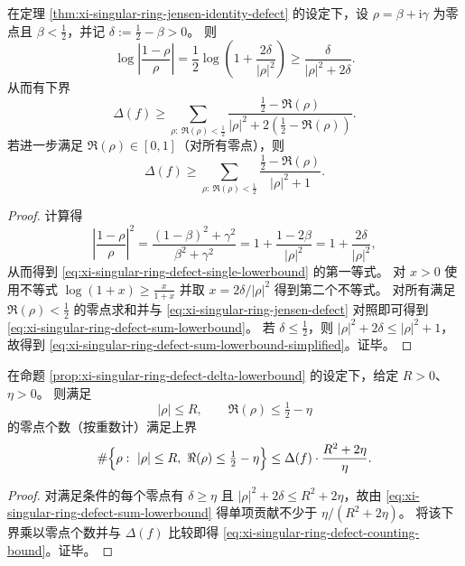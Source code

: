 \begin{proposition}[离临界线偏移的缺陷下界]\label{prop:xi-singular-ring-defect-delta-lowerbound}
在定理 \ref{thm:xi-singular-ring-jensen-identity-defect} 的设定下，设 \(\rho=\beta+\mathrm{i}\gamma\) 为零点且 \(\beta<\tfrac12\)，并记 \(\delta:=\tfrac12-\beta>0\)。
则
\begin{equation}\label{eq:xi-singular-ring-defect-single-lowerbound}
\log\left|\frac{1-\rho}{\rho}\right|
=\frac12\log\!\left(1+\frac{2\delta}{|\rho|^2}\right)
\ge \frac{\delta}{|\rho|^2+2\delta}.
\end{equation}
从而有下界
\begin{equation}\label{eq:xi-singular-ring-defect-sum-lowerbound}
\Delta(f)\ge \sum_{\rho:\ \Re(\rho)<\tfrac12}\frac{\tfrac12-\Re(\rho)}{|\rho|^2+2(\tfrac12-\Re(\rho))}.
\end{equation}
若进一步满足 \(\Re(\rho)\in[0,1]\)（对所有零点），则
\begin{equation}\label{eq:xi-singular-ring-defect-sum-lowerbound-simplified}
\Delta(f)\ge \sum_{\rho:\ \Re(\rho)<\tfrac12}\frac{\tfrac12-\Re(\rho)}{|\rho|^2+1}.
\end{equation}
\end{proposition}
\begin{proof}
计算得
\[
\left|\frac{1-\rho}{\rho}\right|^2
=\frac{(1-\beta)^2+\gamma^2}{\beta^2+\gamma^2}
=1+\frac{1-2\beta}{|\rho|^2}
=1+\frac{2\delta}{|\rho|^2},
\]
从而得到 \eqref{eq:xi-singular-ring-defect-single-lowerbound} 的第一等式。
对 \(x>0\) 使用不等式 \(\log(1+x)\ge \frac{x}{1+x}\) 并取 \(x=2\delta/|\rho|^2\) 得到第二个不等式。
对所有满足 \(\Re(\rho)<\tfrac12\) 的零点求和并与 \eqref{eq:xi-singular-ring-jensen-defect} 对照即可得到 \eqref{eq:xi-singular-ring-defect-sum-lowerbound}。
若 \(\delta\le \tfrac12\)，则 \(|\rho|^2+2\delta\le |\rho|^2+1\)，故得到 \eqref{eq:xi-singular-ring-defect-sum-lowerbound-simplified}。证毕。
\end{proof}

\begin{proposition}[缺陷预算导出的离线零点计数约束]\label{prop:xi-singular-ring-defect-counting-bound}
在命题 \ref{prop:xi-singular-ring-defect-delta-lowerbound} 的设定下，给定 \(R>0\)、\(\eta>0\)。
则满足
\[
|\rho|\le R,\qquad \Re(\rho)\le \tfrac12-\eta
\]
的零点个数（按重数计）满足上界
\begin{equation}\label{eq:xi-singular-ring-defect-counting-bound}
\#\Bigl\{\rho:\ |\rho|\le R,\ \Re(\rho)\le \tfrac12-\eta\Bigr\}
\le \Delta(f)\cdot\frac{R^2+2\eta}{\eta}.
\end{equation}
\end{proposition}
\begin{proof}
对满足条件的每个零点有 \(\delta\ge \eta\) 且 \(|\rho|^2+2\delta\le R^2+2\eta\)，故由
\eqref{eq:xi-singular-ring-defect-sum-lowerbound} 得单项贡献不少于 \(\eta/(R^2+2\eta)\)。
将该下界乘以零点个数并与 \(\Delta(f)\) 比较即得 \eqref{eq:xi-singular-ring-defect-counting-bound}。证毕。
\end{proof}

